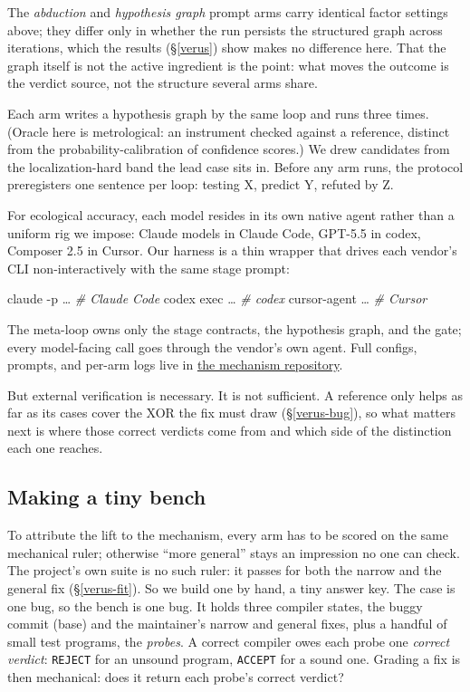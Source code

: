 \documentclass[
  10pt,
]{article}
\newenvironment{Shaded}{}{}
\newcommand{\AttributeTok}[1]{\textcolor[rgb]{0.49,0.56,0.16}{#1}}
\newcommand{\CommentTok}[1]{\textcolor[rgb]{0.38,0.63,0.69}{\textit{#1}}}
\newcommand{\ExtensionTok}[1]{#1}
\newcommand{\NormalTok}[1]{#1}
\begin{document}
The \emph{abduction} and \emph{hypothesis graph} prompt arms carry
identical factor settings above; they differ only in whether the run
persists the structured graph across iterations, which the results
(\S\ref{verus}) show makes no difference here. That the graph itself is
not the active ingredient is the point: what moves the outcome is the
verdict source, not the structure several arms share.

Each arm writes a hypothesis graph by the same loop and runs three
times. (Oracle here is metrological: an instrument checked against a
reference, distinct from the probability-calibration of confidence
scores.) We drew candidates from the localization-hard band the lead
case sits in. Before any arm runs, the protocol preregisters one
sentence per loop: testing X, predict Y, refuted by Z.

For ecological accuracy, each model resides in its own native agent
rather than a uniform rig we impose: Claude models in Claude Code,
GPT-5.5 in codex, Composer 2.5 in Cursor. Our harness is a thin wrapper
that drives each vendor's CLI non-interactively with the same stage
prompt:

\begin{Shaded}
\begin{Highlighting}[]
\ExtensionTok{claude} \AttributeTok{{-}p}\NormalTok{ …       }\CommentTok{\# Claude Code}
\ExtensionTok{codex}\NormalTok{ exec …      }\CommentTok{\# codex}
\ExtensionTok{cursor{-}agent}\NormalTok{ …    }\CommentTok{\# Cursor}
\end{Highlighting}
\end{Shaded}

The meta-loop owns only the stage contracts, the hypothesis graph, and
the gate; every model-facing call goes through the vendor's own agent.
Full configs, prompts, and per-arm logs live in
\href{https://anonymous.4open.science/r/hymech-117E}{the mechanism
repository}.

But external verification is necessary. It is not sufficient. A
reference only helps as far as its cases cover the XOR the fix must draw
(\S\ref{verus-bug}), so what matters next is where those correct
verdicts come from and which side of the distinction each one reaches.

\subsection{Making a tiny bench}\label{verus-bench}

To attribute the lift to the mechanism, every arm has to be scored on
the same mechanical ruler; otherwise ``more general'' stays an
impression no one can check. The project's own suite is no such ruler:
it passes for both the narrow and the general fix (\S\ref{verus-fit}).
So we build one by hand, a tiny answer key. The case is one bug, so the
bench is one bug. It holds three compiler states, the buggy commit
(base) and the maintainer's narrow and general fixes, plus a handful of
small test programs, the \emph{probes}. A correct compiler owes each
probe one \emph{correct verdict}: \texttt{REJECT} for an unsound
program, \texttt{ACCEPT} for a sound one. Grading a fix is then
mechanical: does it return each probe's correct verdict?
\end{document}
